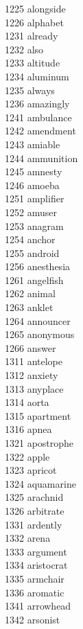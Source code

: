 1225 alongside \\
1226 alphabet \\
1231 already \\
1232 also \\
1233 altitude \\
1234 aluminum \\
1235 always \\
1236 amazingly \\
1241 ambulance \\
1242 amendment \\
1243 amiable \\
1244 ammunition \\
1245 amnesty \\
1246 amoeba \\
1251 amplifier \\
1252 amuser \\
1253 anagram \\
1254 anchor \\
1255 android \\
1256 anesthesia \\
1261 angelfish \\
1262 animal \\
1263 anklet \\
1264 announcer \\
1265 anonymous \\
1266 answer \\
1311 antelope \\
1312 anxiety \\
1313 anyplace \\
1314 aorta \\
1315 apartment \\
1316 apnea \\
1321 apostrophe \\
1322 apple \\
1323 apricot \\
1324 aquamarine \\
1325 arachnid \\
1326 arbitrate \\
1331 ardently \\
1332 arena \\
1333 argument \\
1334 aristocrat \\
1335 armchair \\
1336 aromatic \\
1341 arrowhead \\
1342 arsonist \\
